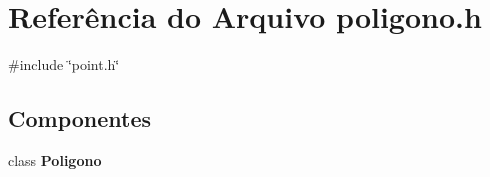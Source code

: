 \section{Referência do Arquivo poligono.\+h}
\label{poligono_8h}
{\ttfamily \#include \char`\"{}point.\+h\char`\"{}}\newline
\subsection*{Componentes}
\begin{DoxyCompactItemize}
\item 
class \textbf{ Poligono}
\end{DoxyCompactItemize}
